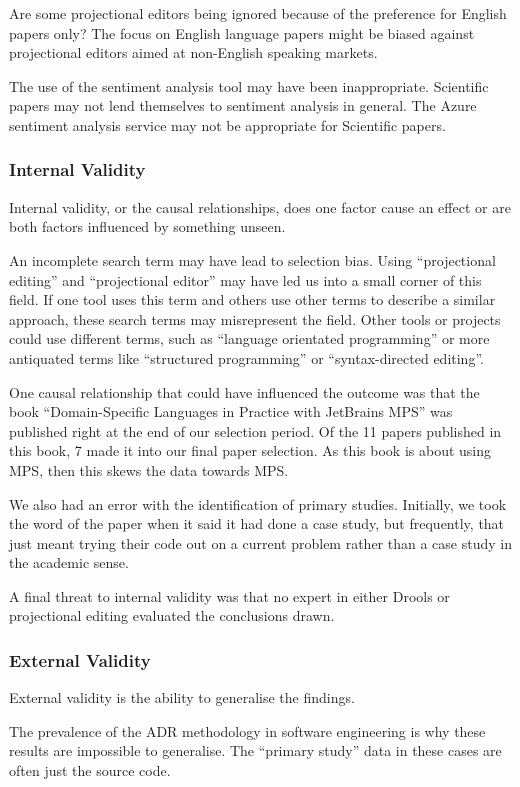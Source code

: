 Are some projectional editors being ignored because of the preference for English papers only?
The focus on English language papers might be biased against projectional editors aimed at non-English speaking markets.

The use of the sentiment analysis tool may have been inappropriate.
Scientific papers may not lend themselves to sentiment analysis in general.
The Azure sentiment analysis service may not be appropriate for Scientific papers.

\subsubsection{Internal Validity}
Internal validity, or the causal relationships, does one factor cause an effect or are both factors influenced by something unseen.

An incomplete search term may have lead to selection bias.  
Using ``projectional editing'' and ``projectional editor'' may have led us into a small corner of this field.
If one tool uses this term and others use other terms to describe a similar approach, these search terms may misrepresent the field.
Other tools or projects could use different terms, such as ``language orientated programming'' or more antiquated terms like ``structured programming'' or ``syntax-directed editing''.

One causal relationship that could have influenced the outcome was that the book ``Domain-Specific Languages in Practice with JetBrains MPS'' was published right at the end of our selection period.
Of the 11 papers published in this book, 7 made it into our final paper selection.
As this book is about using MPS, then this skews the data towards MPS.

We also had an error with the identification of primary studies. 
Initially, we took the word of the paper when it said it had done a case study, but frequently, that just meant trying their code out on a current problem rather than a case study in the academic sense.

A final threat to internal validity was that no expert in either Drools or projectional editing evaluated the conclusions drawn.

\subsubsection{External Validity}
External validity is the ability to generalise the findings.

The prevalence of the ADR methodology in software engineering is why these results are impossible to generalise.
The ``primary study'' data in these cases are often just the source code.


